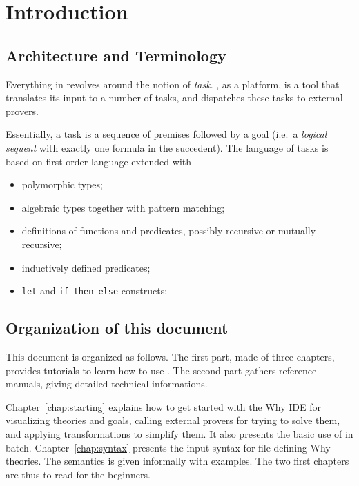 
\chapter{Introduction}

\section{Architecture and Terminology}

Everything in \why revolves around the notion of
\emph{task}.  \why, as a platform, is a tool that
translates its input to a number of tasks, and dispatches these tasks
to external provers. 

Essentially, a task is a sequence of premises followed by a goal
(i.e.~a \emph{logical sequent} with exactly one formula in the
succedent). The language of tasks is based on first-order language
extended with 
\begin{itemize}
\item polymorphic types;
\item algebraic types together with pattern matching;
\item definitions of functions and predicates, possibly recursive or
  mutually recursive;
\item inductively defined predicates;
\item \texttt{let} and \texttt{if-then-else} constructs;
\end{itemize}


\section{Organization of this document}

This document is organized as follows. The first part, made of three chapters, provides tutorials to learn how to use \why. The second part gathers reference
manuals, giving detailed technical informations.

Chapter~\ref{chap:starting} explains how to get started with the Why
IDE for visualizing theories and goals, calling external provers for
trying to solve them, and applying transformations to simplify
them. It also presents the basic use of \why in
batch. Chapter~\ref{chap:syntax} presents the input syntax for file
defining Why theories. The semantics is given informally with
examples.  The two first chapters are thus to read for the beginners.

